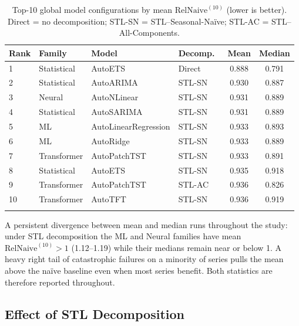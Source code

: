 \documentclass[pdflatex,sn-mathphys-num]{sn-jnl}
\theoremstyle{thmstyleone}
\theoremstyle{thmstyletwo}
\theoremstyle{thmstylethree}
\begin{document}
\begin{table}[ht]
\caption{Top-10 global model configurations by mean $\mathrm{RelNaive}^{(10)}$
(lower is better).
Direct = no decomposition; STL-SN = STL--Seasonal-Na\"ive;
STL-AC = STL--All-Components.}\label{tab:top10}
\begin{tabular*}{\textwidth}{@{\extracolsep\fill}llllcc}
\toprule
Rank & Family & Model & Decomp.\ & Mean & Median \\
\midrule
1  & Statistical  & AutoETS               & Direct  & 0.888 & 0.791 \\
2  & Statistical  & AutoARIMA             & STL-SN  & 0.930 & 0.887 \\
3  & Neural       & AutoNLinear           & STL-SN  & 0.931 & 0.889 \\
4  & Statistical  & AutoSARIMA            & STL-SN  & 0.931 & 0.889 \\
5  & ML           & AutoLinearRegression  & STL-SN  & 0.933 & 0.893 \\
6  & ML           & AutoRidge             & STL-SN  & 0.933 & 0.889 \\
7  & Transformer  & AutoPatchTST          & STL-SN  & 0.933 & 0.891 \\
8  & Statistical  & AutoETS               & STL-SN  & 0.935 & 0.918 \\
9  & Transformer  & AutoPatchTST          & STL-AC  & 0.936 & 0.826 \\
10 & Transformer  & AutoTFT               & STL-SN  & 0.936 & 0.919 \\
\botrule
\end{tabular*}
\end{table}

A persistent divergence between mean and median runs throughout the study:
under STL decomposition the ML and Neural families have mean
$\mathrm{RelNaive}^{(10)} > 1$ (1.12--1.19) while their medians remain near or
below 1.
A heavy right tail of catastrophic failures on a minority of series pulls the
mean above the na\"ive baseline even when most series benefit.
Both statistics are therefore reported throughout.

\subsection{Effect of STL Decomposition}\label{sec:stl_results}
\end{document}
